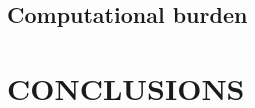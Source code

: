 \documentclass[letterpaper, 10 pt, journal, twoside]{IEEEtran}
\begin{document}
\subsection{Computational burden}

\section{CONCLUSIONS}\label{sec:conclusion}



\end{document}
